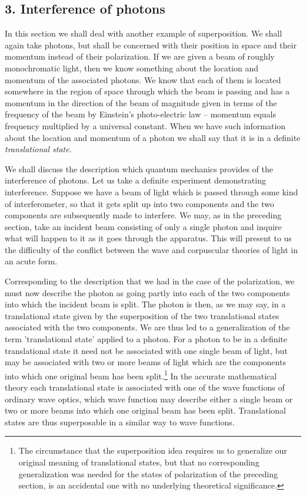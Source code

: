 \subsection{3. Interference of photons}

In this section we shall deal with another example of superposition.  We shall again take photons, but shall be concerned with their position in space and their momentum instead of their polarization.  If we are given a beam of roughly monochromatic light, then we know something about the location and momentum of the associated photons.  We know that each of them is located somewhere in the region of space through which the beam is passing and has a momentum in the direction of the beam of magnitude given in terms of the frequency of the beam by Einstein's photo-electric law -- momentum equals frequency multiplied by a universal constant.  When we have such information about the location and momentum of a photon we shall say that it is in a definite \emph{translational state}.

We shall discuss the description which quantum mechanics provides of the interference of photons.  Let us take a definite experiment demonstrating interference.  Suppose we have a beam of light which is passed through some kind of interferometer, so that it gets split up into two components and the two components are subsequently made to interfere.  We may, as in the preceding section, take an incident beam consisting of only a single photon and inquire what will happen to it as it goes through the apparatus.  This will present to us the difficulty of the conflict between the wave and corpuscular theories of light in an acute form.

Corresponding to the description that we had in the case of the polarization, we must now describe the photon as going partly into each of the two components into which the incident beam is split.  The photon is then, as we may say, in a translational state given by the superposition of the two translational states associated with the two components.  We are thus led to a generalization of the term 'translational state' applied to a photon.  For a photon to be in a definite translational state it need not be associated with one single beam of light, but may be associated with two or more beams of light which are the components into which one original beam has been split.\footnote{The circumstance that the superposition idea requires us to generalize our original meaning of translational states, but that no corresponding generalization was needed for the states of polarization of the preceding section, is an accidental one with no underlying theoretical significance.} In the accurate mathematical theory each translational state is associated with one of the wave functions of ordinary wave optics, which wave function may describe either a single beam or two or more beams into which one original beam has been split.  Translational states are thus superposable in a similar way to wave functions.

